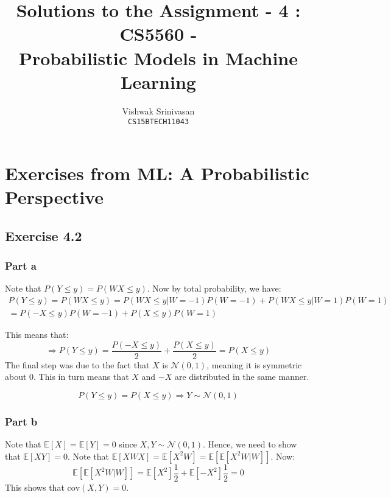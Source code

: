 \documentclass{article}
\title{Solutions to the Assignment - 4 : CS5560 - \\
Probabilistic Models in Machine Learning}
\author{Vishwak Srinivasan\\
\texttt{CS15BTECH11043}}
\date{}
\begin{document}
\maketitle

\section*{Exercises from ML: A Probabilistic Perspective}
\subsection*{Exercise 4.2}
\subsubsection*{Part a}
\begin{flushleft}
Note that \(P(Y \leq y) = P(WX \leq y)\). Now by total probability, we have:
\begin{multline}
P(Y \leq y) = P(WX \leq y) = P(WX \leq y | W = -1)P(W = -1) + P(WX \leq y | W = 1)P(W = 1)\\= P(-X \leq y)P(W = -1) + P(X \leq y)P(W = 1)
\end{multline}

This means that:
\begin{equation}
\Rightarrow P(Y \leq y) = \frac{P(-X \leq y)}{2} + \frac{P(X \leq y)}{2} = P(X \leq y)
\end{equation}
The final step was due to the fact that \(X\) is \(\mathcal{N}(0, 1)\), meaning it is symmetric about 0. This in turn means that \(X\) and \(-X\) are distributed in the same manner.

\[P(Y \leq y) = P(X \leq y) \Rightarrow Y \sim \mathcal{N}(0, 1)\]
\end{flushleft}

\subsubsection*{Part b}
\begin{flushleft}
Note that \(\mathbb{E}[X] = \mathbb{E}[Y] = 0\) since \(X, Y \sim \mathcal{N}(0, 1)\). Hence, we need to show that \(\mathbb{E}[XY] = 0\). Note that \(\mathbb{E}[XWX] = \mathbb{E}[X^2W] = \mathbb{E}[\mathbb{E}[X^2W | W]]\). Now:
\begin{equation}
\mathbb{E}[\mathbb{E}[X^2W | W]] = \mathbb{E}[X^2] \frac{1}{2} + \mathbb{E}[-X^2] \frac{1}{2} = 0
\end{equation}
This shows that \(\mathrm{cov}(X, Y) = 0\).
\end{flushleft}
\end{document}
